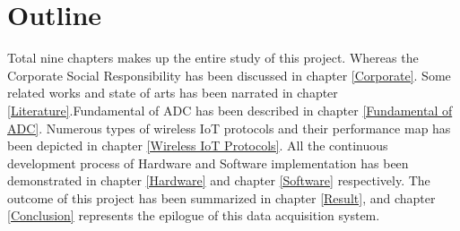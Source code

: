 \section{Outline}
Total nine chapters makes up the entire study of this project. Whereas the Corporate Social Responsibility has been discussed in chapter \ref{Corporate}. Some related works and state of arts has been narrated in chapter \ref{Literature}.Fundamental of ADC has been described in chapter \ref{Fundamental of ADC}. Numerous types of wireless IoT protocols and their performance map has been depicted in chapter \ref{Wireless IoT Protocols}. All the continuous development process of Hardware and Software implementation has been demonstrated in chapter \ref{Hardware} and chapter \ref{Software} respectively. The outcome of this project has been summarized in chapter \ref{Result}, and chapter \ref{Conclusion} represents the epilogue of this data acquisition system.





